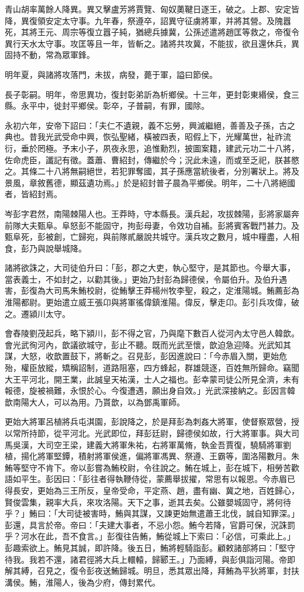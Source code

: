 \begin{pinyinscope}
青山胡率萬餘人降異。異又擊盧芳將賈覽、匈奴薁鞬日逐王，破之。上郡、安定皆降，異復領安定太守事。九年春，祭遵卒，詔異守征虜將軍，并將其營。及隗囂死，其將王元、周宗等復立囂子純，猶總兵據冀，公孫述遣將趙匡等救之，帝復令異行天水太守事。攻匡等且一年，皆斬之。諸將共攻冀，不能拔，欲且還休兵，異固持不動，常為眾軍鋒。

明年夏，與諸將攻落門，未拔，病發，薨于軍，謚曰節侯。

長子彰嗣。明年，帝思異功，復封彰弟訢為析鄉侯。十三年，更封彰東緡侯，食三縣。永平中，徙封平鄉侯。彰卒，子普嗣，有罪，國除。

永初六年，安帝下詔曰：「夫仁不遺親，義不忘勞，興滅繼絕，善善及子孫，古之典也。昔我光武受命中興，恢弘聖緒，橫被四表，昭假上下，光耀萬世，祉祚流衍，垂於罔極。予末小子，夙夜永思，追惟勳烈，披圖案籍，建武元功二十八將，佐命虎臣，讖記有徵。蓋蕭、曹紹封，傳繼於今；況此未遠，而或至乏祀，朕甚愍之。其條二十八將無嗣絕世，若犯罪奪國，其子孫應當統後者，分別署狀上。將及景風，章敘舊德，顯茲遺功焉。」於是紹封普子晨為平鄉侯。明年，二十八將絕國者，皆紹封焉。

岑彭字君然，南陽棘陽人也。王莽時，守本縣長。漢兵起，攻拔棘陽，彭將家屬奔前隊大夫甄阜。阜怒彭不能固守，拘彭母妻，令效功自補。彭將賓客戰鬥甚力。及甄阜死，彭被創，亡歸宛，與前隊貳嚴說共城守。漢兵攻之數月，城中糧盡，人相食，彭乃與說舉城降。

諸將欲誅之，大司徒伯升曰：「彭，郡之大吏，執心堅守，是其節也。今舉大事，當表義士，不如封之，以勸其後。」更始乃封彭為歸德侯，令屬伯升。及伯升遇害，彭復為大司馬朱鮪校尉，從鮪擊王莽楊州牧李聖，殺之，定淮陽城。鮪薦彭為淮陽都尉。更始遣立威王張卬與將軍徭偉鎮淮陽。偉反，擊走卬。彭引兵攻偉，破之。遷潁川太守。

會舂陵劉茂起兵，略下潁川，彭不得之官，乃與麾下數百人從河內太守邑人韓歆。會光武徇河內，歆議欲城守，彭止不聽。既而光武至懷，歆迫急迎降。光武知其謀，大怒，收歆置鼓下，將斬之。召見彭，彭因進說曰：「今赤眉入關，更始危殆，權臣放縱，矯稱詔制，道路阻塞，四方蜂起，群雄競逐，百姓無所歸命。竊聞大王平河北，開王業，此誠皇天祐漢，士人之福也。彭幸蒙司徒公所見全濟，未有報德，旋被禍難，永恨於心。今復遭遇，願出身自效。」光武深接納之。彭因言韓歆南陽大人，可以為用。乃貰歆，以為鄧禹軍師。

更始大將軍呂植將兵屯淇園，彭說降之，於是拜彭為刺姦大將軍，使督察眾營，授以常所持節，從平河北。光武即位，拜彭廷尉，歸德侯如故，行大將軍事。與大司馬吳漢，大司空王梁，建義大將軍朱祐，右將軍萬脩，執金吾賈復，驍騎將軍劉植，揚化將軍堅鐔，積射將軍侯進，偏將軍馮異、祭遵、王霸等，圍洛陽數月。朱鮪等堅守不肯下。帝以彭嘗為鮪校尉，令往說之。鮪在城上，彭在城下，相勞苦歡語如平生。彭因曰：「彭往者得執鞭侍從，蒙薦舉拔擢，常思有以報恩。今赤眉已得長安，更始為三王所反，皇帝受命，平定燕、趙，盡有幽、冀之地，百姓歸心，賢俊雲集，親率大兵，來攻洛陽。天下之事，逝其去矣。公雖嬰城固守，將何待乎？」鮪曰：「大司徒被害時，鮪與其謀，又諫更始無遣蕭王北伐，誠自知罪深。」彭還，具言於帝。帝曰：「夫建大事者，不忌小怨。鮪今若降，官爵可保，況誅罰乎？河水在此，吾不食言。」彭復往告鮪，鮪從城上下索曰：「必信，可乘此上。」彭趣索欲上。鮪見其誠，即許降。後五日，鮪將輕騎詣彭。顧敕諸部將曰：「堅守待我。我若不還，諸君徑將大兵上轘轅，歸郾王。」乃面縛，與彭俱詣河陽。帝即解其縛，召見之，復令彭夜送鮪歸城。明旦，悉其眾出降，拜鮪為平狄將軍，封扶溝侯。鮪，淮陽人，後為少府，傳封累代。


\end{pinyinscope}
